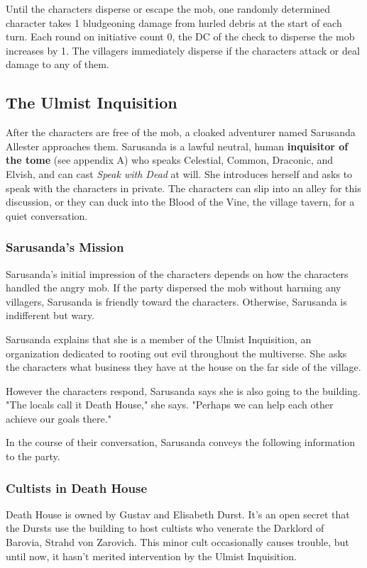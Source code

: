 \documentclass[10pt,a4paper,twoside,bg=print,twocolumn,openany,nodeprecatedcode]{dndbook}
\begin{document}
Until the characters disperse or escape the mob, one randomly determined character takes 1 bludgeoning damage from hurled debris at the start of each turn. Each round on initiative count 0, the DC of the check to disperse the mob increases by 1. The villagers immediately disperse if the characters attack or deal damage to any of them.

\subsection{The Ulmist Inquisition}
After the characters are free of the mob, a cloaked adventurer named Sarusanda Allester approaches them. Sarusanda is a lawful neutral, human \textbf{inquisitor of the tome} (see appendix A) who speaks Celestial, Common, Draconic, and Elvish, and can cast \textit{Speak with Dead} at will. She introduces herself and asks to speak with the characters in private. The characters can slip into an alley for this discussion, or they can duck into the Blood of the Vine, the village tavern, for a quiet conversation.

\subsubsection{Sarusanda's Mission}
Sarusanda's initial impression of the characters depends on how the characters handled the angry mob. If the party dispersed the mob without harming any villagers, Sarusanda is friendly toward the characters. Otherwise, Sarusanda is indifferent but wary.

Sarusanda explains that she is a member of the Ulmist Inquisition, an organization dedicated to rooting out evil throughout the multiverse. She asks the characters what business they have at the house on the far side of the village.

However the characters respond, Sarusanda says she is also going to the building. "The locals call it Death House," she says. "Perhaps we can help each other achieve our goals there."

In the course of their conversation, Sarusanda conveys the following information to the party.

\subsubsection{Cultists in Death House}
Death House is owned by Gustav and Elisabeth Durst. It's an open secret that the Dursts use the building to host cultists who venerate the Darklord of Barovia, Strahd von Zarovich. This minor cult occasionally causes trouble, but until now, it hasn't merited intervention by the Ulmist Inquisition.
\end{document}
